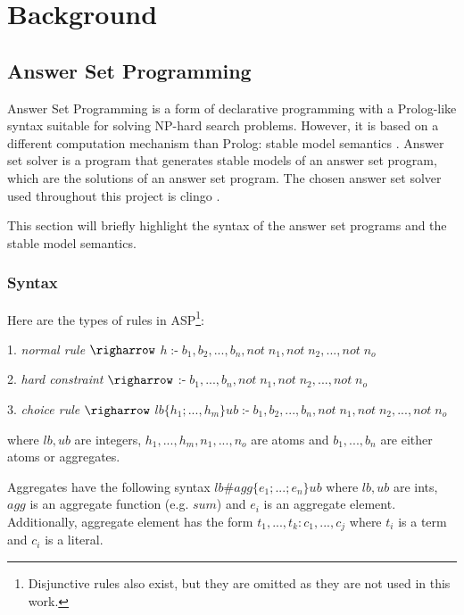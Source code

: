 \chapter{Background}


\section{Answer Set Programming}
\label{answer-set-programming}

Answer Set Programming  \cite{RefWorks:RefID:1-lifschitz2008answer} is a form of declarative programming with a Prolog-like syntax suitable for solving NP-hard search problems.
However, it is based on a different computation mechanism than Prolog: stable model semantics \cite{RefWorks:RefID:21-fitting1992michael}.
Answer set solver is a program that generates stable models of an answer set program, which are the solutions of an answer set program. 
The chosen answer set solver used throughout this project is clingo \cite{RefWorks:RefID:22-clingo}.

This section will briefly highlight the syntax of the answer set programs and the stable model semantics.

\subsection{Syntax}

Here are the types of rules in ASP\footnote{Disjunctive rules also exist, but they are omitted as they are not used in this work.}: 

 1. \emph{normal rule} $\righarrow$ $ h\; \text{:-} \; b_1, b_2, ..., b_n, not\; n_1, not\; n_2, ..., not\; n_o$
 
 2. \emph{hard constraint} $\righarrow$ $\text{:-} \; b_1, ..., b_n, not\; n_1, not\; n_2, ..., not\; n_o$
 
 3. \emph{choice rule} $\righarrow$ $lb\{h_1; ..., h_m\}ub\; \text{:-} \;  b_1, b_2, ..., b_n, not\; n_1, not\; n_2, ..., not\; n_o$
 
where $lb, ub$ are integers, $h_1,..., h_m, n_1,...,n_o$ are atoms and $b_1, ...,b_n$ are either atoms or aggregates.

Aggregates have the following syntax $lb\#agg\{e_1; ...; e_n\}ub$ where $lb, ub$ are ints, $agg$ is an aggregate function (e.g. $sum$) and $e_i$ is an aggregate element.
Additionally, aggregate element has the form  $t_1, ..., t_k : c_1, ..., c_j$ where $t_i$ is a term and $c_i$ is a literal.
 
